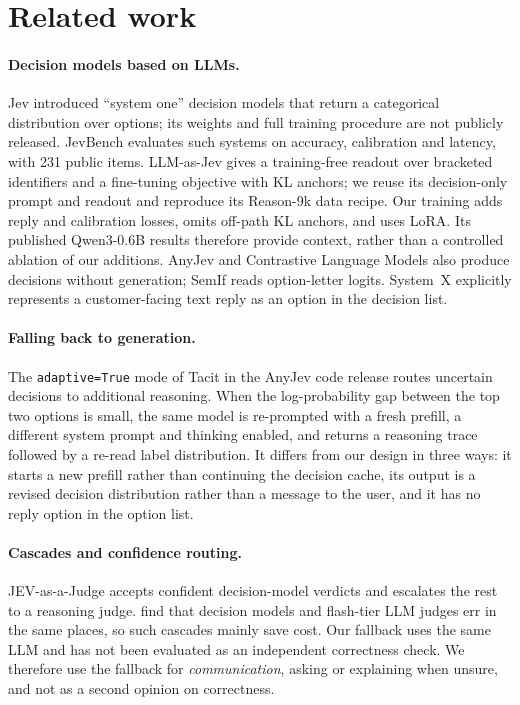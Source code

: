 \documentclass[11pt]{article}
\begin{document}
\section{Related work}\label{sec:related}

\paragraph{Decision models based on LLMs.}
Jev \citep{almeida2026jev} introduced ``system one'' decision models that return a categorical distribution over options; its weights and full training procedure are not publicly released. JevBench \citep{jevbench2026} evaluates such systems on accuracy, calibration and latency, with 231 public items. LLM-as-Jev \citep{li2026llmasjev} gives a training-free readout over bracketed identifiers and a fine-tuning objective with KL anchors; we reuse its decision-only prompt and readout and reproduce its Reason-9k data recipe. Our training adds reply and calibration losses, omits off-path KL anchors, and uses LoRA. Its published Qwen3-0.6B results therefore provide context, rather than a controlled ablation of our additions. AnyJev \citep{zhang2026anyjev} and Contrastive Language Models \citep{kwok2026clm} also produce decisions without generation; SemIf \citep{lee2026semif} reads option-letter logits. System~X explicitly represents a customer-facing text reply as an option in the decision list.

\paragraph{Falling back to generation.}
The \texttt{adaptive=True} mode of Tacit in the AnyJev code release \citep{anyjevrepo} routes uncertain decisions to additional reasoning. When the log-probability gap between the top two options is small, the same model is re-prompted with a fresh prefill, a different system prompt and thinking enabled, and returns a reasoning trace followed by a re-read label distribution. It differs from our design in three ways: it starts a new prefill rather than continuing the decision cache, its output is a revised decision distribution rather than a message to the user, and it has no reply option in the option list.

\paragraph{Cascades and confidence routing.}
JEV-as-a-Judge \citep{li2026jevjudge} accepts confident decision-model verdicts and escalates the rest to a reasoning judge. \citet{rao2026rubric} find that decision models and flash-tier LLM judges err in the same places, so such cascades mainly save cost. Our fallback uses the same LLM and has not been evaluated as an independent correctness check. We therefore use the fallback for \emph{communication}, asking or explaining when unsure, and not as a second opinion on correctness.
\end{document}
